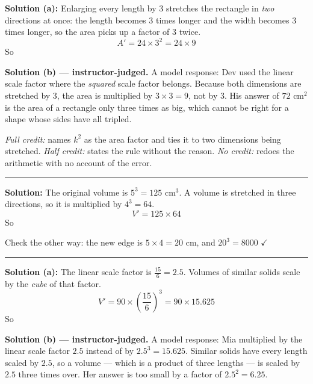 \documentclass[12pt]{article}
\begin{document}




\textbf{Solution (a):} Enlarging every length by $3$ stretches the rectangle in \emph{two} directions at once: the length becomes $3$ times longer and the width becomes $3$ times longer, so the area picks up a factor of $3$ twice.
\[ A' = 24 \times 3^2 = 24 \times 9 \]
So 

\textbf{Solution (b) --- instructor-judged.} A model response: Dev used the linear scale factor where the \emph{squared} scale factor belongs. Because both dimensions are stretched by $3$, the area is multiplied by $3 \times 3 = 9$, not by $3$. His answer of $72$ cm$^2$ is the area of a rectangle only three times as big, which cannot be right for a shape whose sides have all tripled.

\emph{Full credit:} names $k^2$ as the area factor and ties it to two dimensions being stretched. \emph{Half credit:} states the rule without the reason. \emph{No credit:} redoes the arithmetic with no account of the error.

\vspace{0.2cm}\noindent\rule{\linewidth}{0.2pt}


\textbf{Solution:} The original volume is $5^3 = 125$ cm$^3$. A volume is stretched in three directions, so it is multiplied by $4^3 = 64$.
\[ V' = 125 \times 64 \]
So 

Check the other way: the new edge is $5 \times 4 = 20$ cm, and $20^3 = 8000$ $\checkmark$

\vspace{0.2cm}\noindent\rule{\linewidth}{0.2pt}


\textbf{Solution (a):} The linear scale factor is $\frac{15}{6} = 2.5$. Volumes of similar solids scale by the \emph{cube} of that factor.
\[ V' = 90 \times \left(\frac{15}{6}\right)^3 = 90 \times 15.625 \]
So 

\textbf{Solution (b) --- instructor-judged.} A model response: Mia multiplied by the linear scale factor $2.5$ instead of by $2.5^3 = 15.625$. Similar solids have every length scaled by $2.5$, so a volume --- which is a product of three lengths --- is scaled by $2.5$ three times over. Her answer is too small by a factor of $2.5^2 = 6.25$.
\end{document}
